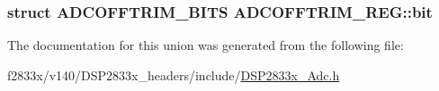 \subsubsection[{bit}]{\setlength{\rightskip}{0pt plus 5cm}struct {\bf A\+D\+C\+O\+F\+F\+T\+R\+I\+M\+\_\+\+B\+I\+T\+S} A\+D\+C\+O\+F\+F\+T\+R\+I\+M\+\_\+\+R\+E\+G\+::bit}\label{union_a_d_c_o_f_f_t_r_i_m___r_e_g_a7dac1b351eb7aa366e12f1ef3ab2ec6d}


The documentation for this union was generated from the following file\+:\begin{DoxyCompactItemize}
\item 
f2833x/v140/\+D\+S\+P2833x\+\_\+headers/include/\hyperlink{_d_s_p2833x___adc_8h}{D\+S\+P2833x\+\_\+\+Adc.\+h}\end{DoxyCompactItemize}
